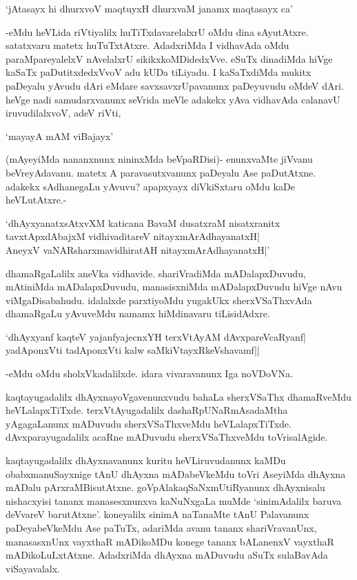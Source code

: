 \begin{shloka}
`jAtasayx hi dhurxvoV maqtuyxH dhurxvaM janamx maqtasayx ca'
\end{shloka} 

-eMdu heVLida riVtiyalilx huTiTxdavarelalxrU oMdu dina sAyutAtxre. satatxvaru matetx huTuTxtAtxre. AdadxriMda I vidhavAda oMdu paraMpareyalelxV nAvelalxrU sikikxkoMDidedxVve. eSuTx dinadiMda hiVge kaSaTx paDutitxdedxVvoV adu kUDa tiLiyadu. I kaSaTxdiMda mukitx paDeyalu yAvudu dAri eMdare savxsavxrUpavanunx paDeyuvudu oMdeV dAri. heVge nadi samudarxvanunx seVrida meVle adakekx yAva vidhavAda calanavU iruvudilalxvoV, adeV riVti, 

\begin{shloka}
`mayayA mAM viBajayx'
\end{shloka}

(mAyeyiMda nananxnunx nininxMda beVpaRDisi)- enunxvaMte jiVvanu beVreyAdavanu. matetx A paravasutxvanunx paDeyalu Ase paDutAtxne. adakekx sAdhanegaLu yAvuvu? apapxyayx diVkiSxtaru oMdu kaDe heVLutAtxre.-

\begin{shloka}
`dhAyxyanatxsAtxvXM katicana BavaM dusatxraM nisatxranitx\\
tavxtApxdAbajxM vidhivaditareV nitayxmArAdhayanatxH|\\
AneyxV vaNARsharxmavidhiratAH nitayxmArAdhayanatxH|'
\end{shloka}

dhamaRgaLalilx aneVka vidhavide. shariVradiMda mADalapxDuvudu, mAtiniMda mADalapxDuvudu, manasisxniMda mADalapxDuvudu hiVge nAvu viMgaDisabahudu. idalalxde parxtiyoMdu yugakUkx sherxVSaThxvAda dhamaRgaLu yAvuveMdu namamx hiMdinavaru tiLisidAdxre.

\begin{shloka}
`dhAyxyanf kaqteV yajanfyajecnxYH terxVtAyAM dAvxpareV\s caRyanf|\\
yadAponxVti tadAponxVti kalw saMkiVtayxRkeVshavamf||
\end{shloka}

-eMdu oMdu sholxVkadalilxde. idara vivaravanunx Iga noVDoVNa.

kaqtayugadalilx dhAyxnayoVgavenunxvudu bahaLa sherxVSaThx dhamaRveMdu heVLalapxTiTxde. terxVtAyugadalilx dashaRpUNaRmAsadaMtha yAgagaLanunx mADuvudu sherxVSaThxveMdu heVLalapxTiTxde. dAvxparayugadalilx acaRne mADuvudu sherxVSaThxveMdu toVrisalAgide.

kaqtayugadalilx dhAyxnavanunx kuritu heVLiruvudanunx kaMDu obabxmanuSayxnige tAnU dhAyxna mADabeVkeMdu toVri AseyiMda dhAyxna mADalu pArxraMBisutAtxne. goVpAlakaqSaNxmUtiRyanunx dhAyxnisalu nishacxyisi tananx manasesxnunxva kaNuNxgaLa muMde `sinimAdalilx baruva deVvareV barutAtxne'. koneyalilx sinimA naTanaMte tAnU Palavanunx paDeyabeVkeMdu Ase paTuTx, adariMda avanu tananx shariVravanUnx, manasasxnUnx vayxthaR mADikoMDu konege tananx bALanenxV vayxthaR mADikoLuLxtAtxne. AdadxriMda dhAyxna mADuvudu aSuTx sulaBavAda viSayavalalx.

